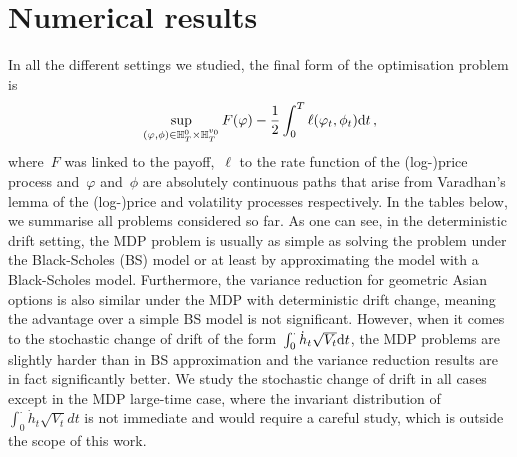 \section{Numerical results}\label{sec:Num_results}
In all the different settings we studied, the final form of the optimisation problem is
$$
\sup_{(\varphi, \phi)\in \mathbb{H}_T^0\times \mathbb{H}_T^{v_0}}F(\varphi) - \frac{1}{2}\int_0^T\ell(\varphi_t,\phi_t)\mathrm{d} t\,,
$$
where~$F$ was linked to the payoff,~$\ell$ to the rate function of the (log-)price process and~$\varphi$ and~$\phi$ are absolutely continuous paths that arise from Varadhan's lemma of the (log-)price and volatility processes respectively.
In the tables below, we summarise all problems considered so far. As one can see, in the deterministic drift setting, the MDP problem is usually as simple as solving the problem under the Black-Scholes (BS) model or at least by approximating the model with a Black-Scholes model. Furthermore, the variance reduction for geometric Asian options is also similar under the MDP with deterministic drift change, meaning the advantage over a simple BS model is not significant. However, when it comes to the stochastic change of drift of the form~$\int_0^\cdot\dot{h}_t\sqrt{V_t}\mathrm{d} t$, the MDP problems are slightly harder than in BS approximation and the variance reduction results are in fact significantly better. We study the stochastic change of drift in all cases except in the MDP large-time case, where the invariant distribution of~$\int_0^\cdot \dot{h}_{t}\sqrt{V_t}dt$ is not immediate and would require a careful study, which is outside the scope of this work.
\begin{table}[H]
\centering
\caption{Summary of the optimisations with \textit{deterministic} change of drift. %
}
\end{table}

